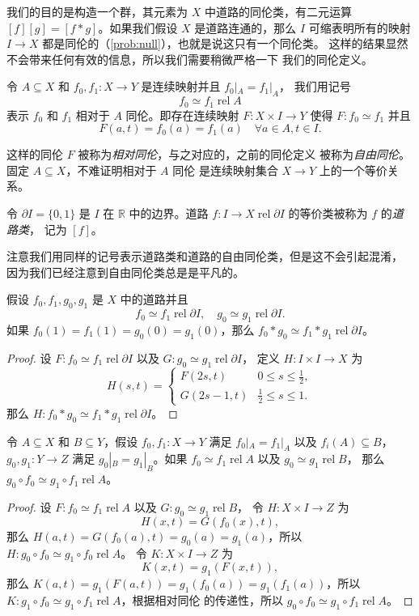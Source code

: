 \documentclass[fontset=none]{Notes}
\DeclareMathOperator\rel{rel}
\newcommand{\partI}{\partial I}
\newcommand{\relhomo}{\rel\partI}
\begin{document}
我们的目的是构造一个群，其元素为 $X$ 中道路的同伦类，有二元运算
$[f][g]=[f*g]$。如果我们假设 $X$ 是道路连通的，那么 $I$ 可缩表明所有的映射
$I\to X$ 都是同伦的（\ref{prob:null}），也就是说这只有一个同伦类。
这样的结果显然不会带来任何有效的信息，所以我们需要稍微严格一下
我们的同伦定义。

\begin{definition}
  令 $A\subseteq X$ 和 $f_0,f_1:X\to Y$ 是连续映射并且 $f_0|_A=f_1|_A$，
  我们用记号
  \[
    f_0\simeq f_1\rel A
  \]
  表示 $f_0$ 和 $f_1$ 相对于 $A$ 同伦。即存在连续映射
  $F:X\times I\to Y$ 使得 $F:f_0\simeq f_1$ 并且
  \[
    F(a,t)=f_0(a)=f_1(a)\quad \forall a\in A,t\in I.
  \] 
\end{definition}

这样的同伦 $F$ 被称为\emph{相对同伦}，与之对应的，之前的同伦定义
被称为\emph{自由同伦}。固定 $A\subseteq X$，不难证明相对于 $A$ 同伦
是连续映射集合 $X\to Y$ 上的一个等价关系。

\begin{definition}
  令 $\partI=\{0,1\}$ 是 $I$ 在 $\mathbb{R}$ 中的边界。道路
  $f:I\to X\rel\partI$ 的等价类被称为 $f$ 的\emph{道路类}，
  记为 $[f]$。
\end{definition}

注意我们用同样的记号表示道路类和道路的自由同伦类，但是这不会引起混淆，
因为我们已经注意到自由同伦类总是是平凡的。

\begin{theorem}
  假设 $f_0,f_1,g_0,g_1$ 是 $X$ 中的道路并且
  \[
    f_0\simeq f_1\relhomo,\quad g_0\simeq g_1\relhomo.
  \]
  如果 $f_0(1)=f_1(1)=g_0(0)=g_1(0)$，那么 $f_0*g_0\simeq f_1*g_1\relhomo$。
\end{theorem}
\begin{proof}
  设 $F:f_0\simeq f_1\relhomo$ 以及 $G:g_0\simeq g_1\relhomo$，
  定义 $H:I\times I\to X$ 为
  \[
    H(s,t)=\begin{cases}
      F(2s,t) & 0\leq s\leq \frac{1}{2},\\
      G(2s-1,t) & \frac{1}{2}\leq s\leq 1.
    \end{cases}
  \]
  那么 $H:f_0*g_0\simeq f_1*g_1\relhomo$。
\end{proof}

\begin{problem}{}{}
  令 $A\subseteq X$ 和 $B\subseteq Y$，假设 $f_0,f_1:X\to Y$
  满足 $f_0|_A=f_1|_A$ 以及 $f_i(A)\subseteq B$，$g_0,g_1:Y\to Z$
  满足 $g_0|_B=g_1|_B$。如果 $f_0\simeq f_1\rel A$ 以及 $g_0\simeq g_1\rel B$，
  那么 $g_0\circ f_0\simeq g_1\circ f_1\rel A$。
\end{problem}
\begin{proof}
  设 $F:f_0\simeq f_1\rel A$ 以及 $G:g_0\simeq g_1\rel B$，
  令 $H:X\times I\to Z$ 为
  \[
    H(x,t)=G(f_0(x),t),
  \]
  那么 $H(a,t)=G(f_0(a),t)=g_0(a)=g_1(a)$，所以 
  $H:g_0\circ f_0\simeq g_1\circ f_0\rel A$。
  令 $K:X\times I\to Z$ 为
  \[
    K(x,t)=g_1(F(x,t)),
  \]
  那么 $K(a,t)=g_1(F(a,t))=g_1(f_0(a))=g_1(f_1(a))$，所以
  $K:g_1\circ f_0\simeq g_1\circ f_1\rel A$，根据相对同伦
  的传递性，所以 $g_0\circ f_0\simeq g_1\circ f_1\rel A$。
\end{proof}
\end{document}
